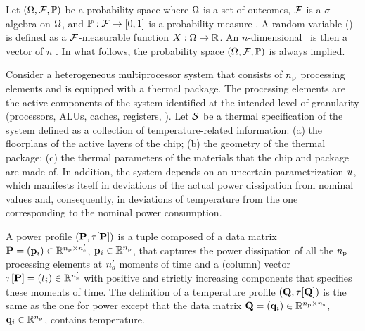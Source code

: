 Let $(\Omega, \mathcal{F}, \mathbb{P})$ be a probability space where $\Omega$ is a set of outcomes, $\mathcal{F}$ is a $\sigma$-algebra on $\Omega$, and $\mathbb{P}: \mathcal{F} \to [0, 1]$ is a probability measure \cite{durrett2010}. A random variable (\rv) is defined as a $\mathcal{F}$-measurable function $X: \Omega \to \mathbb{R}$. An $n$-dimensional \rv\ is then a vector of $n$ \rvs. In what follows, the probability space $(\Omega, \mathcal{F}, \mathbb{P})$ is always implied.

Consider a heterogeneous multiprocessor system that consists of ${n_\text{p}}$ processing elements and is equipped with a thermal package. The processing elements are the active components of the system identified at the intended level of granularity (processors, ALUs, caches, registers, \etc). Let $\mathcal{S}$ be a thermal specification of the system defined as a collection of temperature-related information: (a) the floorplans of the active layers of the chip; (b) the geometry of the thermal package; (c) the thermal parameters of the materials that the chip and package are made of. In addition, the system depends on an uncertain parametrization $u$, which manifests itself in deviations of the actual power dissipation from nominal values and, consequently, in deviations of temperature from the one corresponding to the nominal power consumption.

A power profile $\profileP$ is a tuple composed of a data matrix $\mathbf{P} = (\mathbf{p}_i) \in \mathbb{R}^{{n_\text{p}} \times {n_\text{s}'}}$, $\mathbf{p}_i \in \mathbb{R}^{n_\text{p}}$, that captures the power dissipation of all the ${n_\text{p}}$ processing elements at ${n_\text{s}'}$ moments of time and a (column) vector $\tau[\mathbf{P}] = (t_i) \in \mathbb{R}^{{n_\text{s}'}}$ with positive and strictly increasing components that specifies these moments of time. The definition of a temperature profile $\profileT$ is the same as the one for power except that the data matrix $\mathbf{Q} = (\mathbf{q}_i) \in \mathbb{R}^{{n_\text{p}} \times {n_\text{s}}}$, $\mathbf{q}_i \in \mathbb{R}^{n_\text{p}}$, contains temperature.

